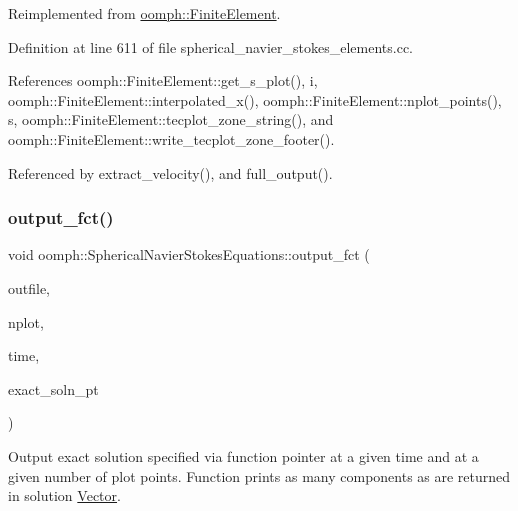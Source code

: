 Reimplemented from \hyperlink{classoomph_1_1FiniteElement_a22b695c714f60ee6cd145be348042035}{oomph\+::\+Finite\+Element}.



Definition at line 611 of file spherical\+\_\+navier\+\_\+stokes\+\_\+elements.\+cc.



References oomph\+::\+Finite\+Element\+::get\+\_\+s\+\_\+plot(), i, oomph\+::\+Finite\+Element\+::interpolated\+\_\+x(), oomph\+::\+Finite\+Element\+::nplot\+\_\+points(), s, oomph\+::\+Finite\+Element\+::tecplot\+\_\+zone\+\_\+string(), and oomph\+::\+Finite\+Element\+::write\+\_\+tecplot\+\_\+zone\+\_\+footer().



Referenced by extract\+\_\+velocity(), and full\+\_\+output().

\mbox{\label{classoomph_1_1SphericalNavierStokesEquations_ad7e8436cec2be7afaa2f0a3ad0a38ec9}} 
\subsubsection{\texorpdfstring{output\+\_\+fct()}{output\_fct()}\hspace{0.1cm}{\footnotesize\ttfamily [2/2]}}
{\footnotesize\ttfamily void oomph\+::\+Spherical\+Navier\+Stokes\+Equations\+::output\+\_\+fct (\begin{DoxyParamCaption}\item[{std\+::ostream \&}]{outfile,  }\item[{const unsigned \&}]{nplot,  }\item[{const double \&}]{time,  }\item[{\hyperlink{classoomph_1_1FiniteElement_ad4ecf2b61b158a4b4d351a60d23c633e}{Finite\+Element\+::\+Unsteady\+Exact\+Solution\+Fct\+Pt}}]{exact\+\_\+soln\+\_\+pt }\end{DoxyParamCaption})\hspace{0.3cm}{\ttfamily [virtual]}}



Output exact solution specified via function pointer at a given time and at a given number of plot points. Function prints as many components as are returned in solution \hyperlink{classoomph_1_1Vector}{Vector}. 

